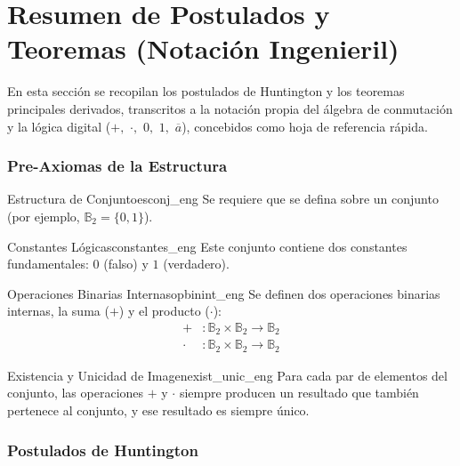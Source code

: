 \chapter{Resumen de Postulados y Teoremas (Notación Ingenieril)}
En esta sección se recopilan los postulados de Huntington y los teoremas principales derivados, transcritos a la notación propia del álgebra de conmutación y la lógica digital ($+,$ $\cdot,$ $0,$ $1,$ $\overline{a}$), concebidos como hoja de referencia rápida.

\subsection*{Pre-Axiomas de la Estructura}

\setcounter{tcb@cnt@preaxioma}{0}
\begin{preaxioma}{Estructura de Conjunto}{esconj_eng}
Se requiere que se defina sobre un conjunto (por ejemplo, $\mathbb{B}_2 = \{0, 1\}$).
\end{preaxioma}

\setcounter{tcb@cnt@preaxioma}{1}
\begin{preaxioma}{Constantes Lógicas}{constantes_eng}
Este conjunto contiene dos constantes fundamentales: $0$ (falso) y $1$ (verdadero).
\end{preaxioma}

\setcounter{tcb@cnt@preaxioma}{2}
\begin{preaxioma}{Operaciones Binarias Internas}{opbinint_eng}
Se definen dos operaciones binarias internas, la suma ($+$) y el producto ($\cdot$):
\begin{align*}
+ &: \mathbb{B}_2 \times \mathbb{B}_2 \to \mathbb{B}_2 \\
\cdot &: \mathbb{B}_2 \times \mathbb{B}_2 \to \mathbb{B}_2
\end{align*}
\end{preaxioma}

\setcounter{tcb@cnt@preaxioma}{4}
\begin{preaxioma}{Existencia y Unicidad de Imagen}{exist_unic_eng}
Para cada par de elementos del conjunto, las operaciones $+$ y $\cdot$ siempre producen un resultado que también pertenece al conjunto, y ese resultado es siempre único.
\end{preaxioma}

\subsection*{Postulados de Huntington}

